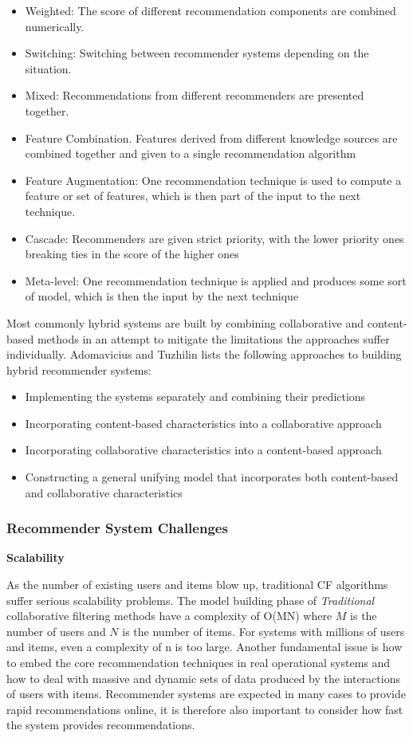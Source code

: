 \begin{itemize}
\item Weighted: The score of different recommendation components are combined numerically.
\item Switching: Switching between recommender systems depending on the situation.
\item Mixed: Recommendations from different recommenders are presented together.
\item Feature Combination. Features derived from different knowledge sources are combined together and given to a single recommendation algorithm
\item Feature Augmentation: One recommendation technique is used to compute a feature or set of features, which is then part of the input to the next technique.
\item Cascade: Recommenders are given strict priority, with the lower priority ones breaking ties in the score of the higher ones
\item Meta-level: One recommendation technique is applied and produces some sort of model, which is then the input by the next technique
\end{itemize}

Most commonly hybrid systems are built by combining collaborative and content-based methods in an attempt to mitigate the limitations the approaches suffer individually. Adomavicius and Tuzhilin \cite{Adomavicius2005} lists the following approaches to building hybrid recommender systems:

\begin{itemize}
\item Implementing the systems separately and combining their predictions
\item Incorporating content-based characteristics into a collaborative approach
\item Incorporating collaborative characteristics into a content-based approach
\item Constructing a general unifying model that incorporates both content-based and collaborative characteristics
\end{itemize}

\subsubsection{Recommender System Challenges}

\textbf{Scalability}

As the number of existing users and items blow up, traditional CF algorithms suffer serious scalability problems. The model building phase of \emph{Traditional} collaborative filtering methods have a complexity of O(MN) where $M$ is the number of users and $N$ is the number of items. For systems with millions of users and items, even a complexity of n is too large. Another fundamental issue is how to embed the core recommendation techniques in real operational systems and how to deal with massive and dynamic sets of data produced by the interactions of users with items. Recommender systems are expected in many cases to provide rapid recommendations online, it is therefore also important to consider how fast the system provides recommendations.

